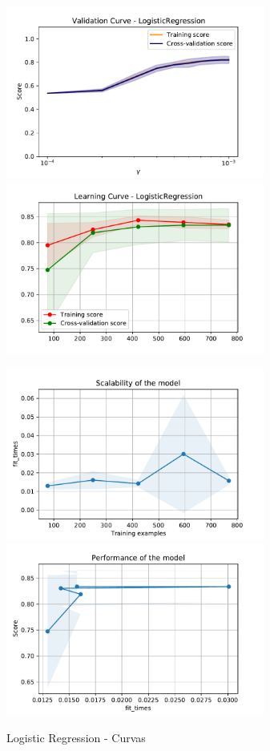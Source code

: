 \documentclass[12pt,twoside]{report}
\begin{document}
\begin{figure}[ht!]
\begin{multicols}{2}
\includegraphics[width=8.5cm]{./code/figures_python/validation_curves/lr.pdf}%
\columnbreak
\includegraphics[width=8.5cm]{./code/figures_python/learning_curves/lr.pdf}%
\end{multicols}

\begin{multicols}{2}
\includegraphics[width=8.5cm]{./code/figures_python/learning_curves/lr_scalability.pdf}%
\columnbreak
\includegraphics[width=8.5cm]{./code/figures_python/learning_curves/lr_performance.pdf}%
\end{multicols}
\caption{Logistic Regression - Curvas}
\label{lr:curves}
\end{figure}
\end{document}
